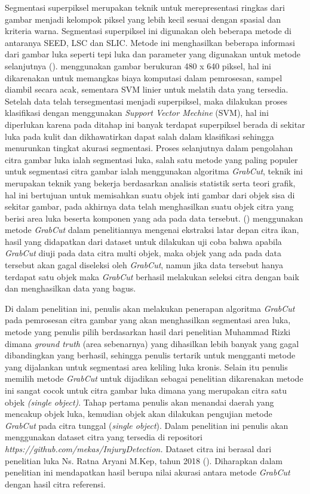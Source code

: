 Segmentasi superpiksel merupakan teknik untuk merepresentasi ringkas dari gambar 
menjadi kelompok piksel yang lebih kecil sesuai dengan spasial dan kriteria warna. 
Segmentasi superpiksel  ini digunakan oleh beberapa metode di antaranya SEED, LSC 
dan SLIC. Metode ini menghasilkan beberapa informasi dari gambar luka seperti tepi 
luka dan parameter yang digunakan untuk metode selanjutnya (\cite{Silva:2021}). 
\cite{Wang:2015} menggunakan gambar berukuran 480 x 640 piksel, hal ini dikarenakan 
untuk memangkas biaya komputasi dalam pemrosesan, sampel diambil secara acak, sementara 
SVM linier untuk melatih data yang tersedia. Setelah data telah tersegmentasi menjadi 
superpiksel, maka dilakukan proses klasifikasi dengan menggunakan \emph{Support Vector 
Mechine} (SVM), hal ini diperlukan karena pada ditahap ini banyak terdapat superpiksel 
berada di sekitar luka pada kulit dan dikhawatirkan dapat salah dalam klasifikasi 
sehingga menurunkan tingkat akurasi segmentasi. Proses selanjutnya dalam pengolahan 
citra gambar luka ialah segmentasi luka, salah satu metode yang paling populer untuk 
segmentasi citra gambar ialah menggunakan algoritma \emph{GrabCut}, teknik ini merupakan 
teknik yang bekerja berdasarkan analisis statistik serta teori grafik, hal ini 
bertujuan untuk memisahkan suatu objek inti gambar dari objek sisa di sekitar gambar, 
pada akhirnya data telah menghasilkan suatu objek citra yang berisi area luka beserta 
komponen yang ada pada data tersebut. (\cite{Nugraha:2022}) menggunakan metode 
\emph{GrabCut} dalam penelitiannya mengenai ekstraksi latar depan citra ikan, hasil yang 
didapatkan dari dataset untuk dilakukan uji coba bahwa apabila \emph{GrabCut} diuji pada 
data citra multi objek, maka objek yang ada pada data tersebut akan gagal diseleksi 
oleh \emph{GrabCut}, namun jika data tersebut hanya terdapat satu objek maka \emph{GrabCut} berhasil 
melakukan seleksi citra dengan baik dan menghasilkan data yang bagus.


Di dalam penelitian ini, penulis akan melakukan penerapan algoritma \emph{GrabCut} pada 
pemrosesan citra gambar yang akan menghasilkan segmentasi area luka, metode yang 
penulis pilih berdasarkan hasil dari penelitian Muhammad Rizki dimana \emph{ground truth} (area sebenarnya) 
yang dihasilkan lebih banyak yang gagal dibandingkan yang berhasil, sehingga penulis 
tertarik untuk mengganti metode yang dijalankan untuk segmentasi area keliling luka 
kronis. Selain itu penulis memilih metode \emph{GrabCut} untuk dijadikan sebagai 
penelitian dikarenakan metode ini sangat cocok untuk citra gambar luka dimana yang 
merupakan citra satu objek \emph{(single object)}. Tahap pertama penulis akan menandai 
daerah yang mencakup objek luka, kemudian objek akan dilakukan pengujian metode 
\emph{GrabCut} pada citra tunggal (\emph{single object}). Dalam penelitian ini 
penulis akan menggunakan dataset citra yang tersedia di repositori \emph{https://github.com/mekas/InjuryDetection.}
Dataset citra ini berasal dari penelitian luka Ns. Ratna Aryani M.Kep, tahun 2018 
(\cite{Aryani:2018}). Diharapkan dalam penelitian ini mendapatkan hasil berupa nilai 
akurasi antara metode \emph{GrabCut} dengan hasil citra referensi.

